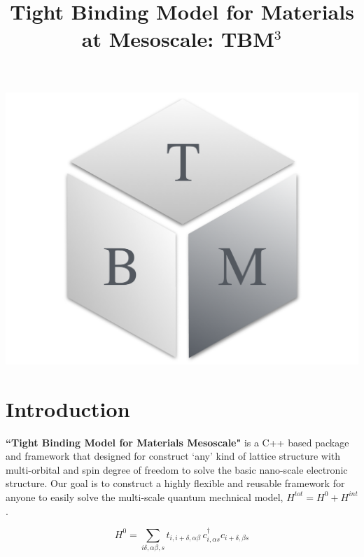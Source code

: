 \documentclass{article}
\title{
\vspace{1in}
\textmd{\textbf{Tight Binding Model for Materials at Mesoscale: TBM$^3$}}\\
\vspace{1in}
}
\author{\textbf{\AuthorName}}
\date{} %
\begin{document}
\maketitle

\vspace{1in}
\begin{center}
\includegraphics[scale=0.3]{TBMCube-LOGO.pdf}
\end{center}



\newpage
\tableofcontents
\newpage


\section{Introduction}

{\bf ``Tight Binding Model for Materials Mesoscale"} is a C++ based package and framework that designed for construct `any' kind of lattice structure with multi-orbital and spin degree of freedom to solve the basic nano-scale electronic structure.
Our goal is to construct a highly flexible and reusable framework for anyone to easily solve the multi-scale quantum mechnical model, $H^{tot} = H^0+ H^{int}$.

\begin{equation}
	\label{hopping}
	H^0 = \sum_{i\delta,\alpha\beta,s} t_{i,i+\delta,\alpha\beta}\, c^\dagger_{i,\alpha s} c_{i+\delta,\beta s}
\end{equation}
\end{document}
